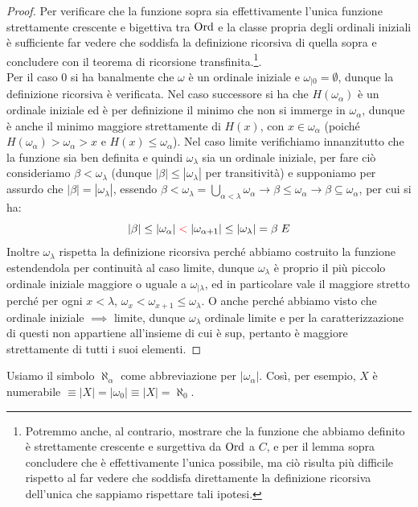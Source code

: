\begin{proof}
	Per verificare che la funzione sopra sia effettivamente l'unica funzione strettamente crescente e bigettiva tra $\operatorname{Ord}$ e la classe propria degli ordinali iniziali \`e sufficiente far vedere che soddisfa la definizione
	ricorsiva di quella sopra e concludere con il teorema di ricorsione transfinita.\footnote{Potremmo anche, al contrario, mostrare che la funzione che abbiamo definito \`e strettamente crescente e surgettiva da $\operatorname{Ord}$ a $C$, e per
	il lemma sopra concludere che \`e effettivamente l'unica possibile, ma ci\`o risulta pi\`u difficile rispetto al far vedere che soddisfa direttamente la definizione ricorsiva dell'unica che sappiamo rispettare tali ipotesi.}.\\
	Per il caso 0 si ha banalmente che $\omega$ \`e un ordinale iniziale e $\omega_{|0} = \emptyset$, dunque la definizione ricorsiva \`e verificata. Nel caso successore si ha che $H(\omega_\alpha)$ \`e un ordinale iniziale ed \`e per definizione il minimo che non si immerge in $\omega_\alpha$, dunque \`e anche il minimo maggiore strettamente di $H(x)$, con
	$x \in \omega_\alpha$ (poich\'e $H(\omega_\alpha) > \omega_\alpha > x$ e $H(x) \leq \omega_\alpha$).
	Nel caso limite verifichiamo innanzitutto che la funzione sia ben definita e quindi $\omega_\lambda$ sia un ordinale iniziale, per fare ci\`o consideriamo $\beta < \omega_\lambda$ (dunque $|\beta| \leq |\omega_\lambda|$ per transitivit\`a) e supponiamo per assurdo che $|\beta| = |\omega_\lambda|$,
	essendo $\beta < \omega_\lambda = \bigcup_{\alpha < \lambda} \omega_\alpha \to \beta \leq \omega_\alpha \to \beta \subseteq \omega_\alpha$, per cui si ha:
	\[ |\beta| \leq |\omega_\alpha| \;\textcolor{red}{<}\; |\omega_{\alpha + 1}| \leq |\omega_\lambda| = \beta \; \lightning
		\]
	Inoltre $\omega_\lambda$ rispetta la definizione ricorsiva perch\'e abbiamo costruito la funzione estendendola per continuit\`a al caso limite, dunque $\omega_\lambda$ \`e proprio il pi\`u piccolo ordinale iniziale maggiore o uguale a $\omega_{|\lambda}$,
	ed in particolare vale il maggiore stretto perch\'e per ogni $x < \lambda$, $\omega_x < \omega_{x + 1} \leq \omega_{\lambda}$. O anche perch\'e abbiamo visto che ordinale iniziale $\implies$ limite, dunque $\omega_\lambda$ ordinale limite e per la caratterizzazione di questi non appartiene all'insieme di cui \`e sup,
	pertanto \`e maggiore strettamente di tutti i suoi elementi.
\end{proof}

\begin{notation}[$|\omega_\alpha| = \aleph_\alpha$]
	Usiamo il simbolo $\aleph_\alpha$ come abbreviazione per $|\omega_\alpha|$. Cos\`i, per esempio, $X$ \`e numerabile $\equiv |X| = |\omega_0| \equiv |X| = \aleph_0$.
\end{notation}


